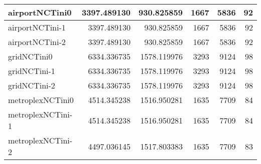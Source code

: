\begin{longtable}{|l|r|r|r|r|r|}
airportNCTini0 & 3397.489130 & 930.825859 & 1667 & 5836 & 92 \\ \hline
airportNCTini-1 & 3397.489130 & 930.825859 & 1667 & 5836 & 92 \\ \hline
airportNCTini-2 & 3397.489130 & 930.825859 & 1667 & 5836 & 92 \\ \hline
gridNCTini0 & 6334.336735 & 1578.119976 & 3293 & 9124 & 98 \\ \hline
gridNCTini-1 & 6334.336735 & 1578.119976 & 3293 & 9124 & 98 \\ \hline
gridNCTini-2 & 6334.336735 & 1578.119976 & 3293 & 9124 & 98 \\ \hline
metroplexNCTini0 & 4514.345238 & 1516.950281 & 1635 & 7709 & 84 \\ \hline
metroplexNCTini-1 & 4514.345238 & 1516.950281 & 1635 & 7709 & 84 \\ \hline
metroplexNCTini-2 & 4497.036145 & 1517.803383 & 1635 & 7709 & 83 \\ \hline
\end{longtable}
